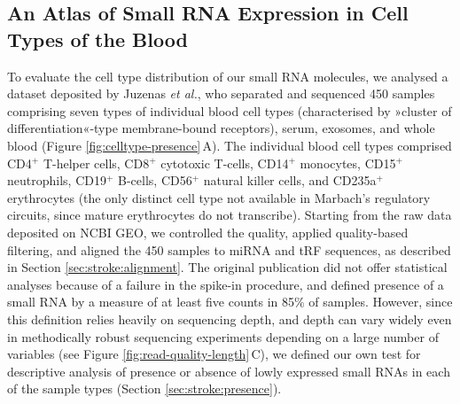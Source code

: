 \begin{method}
\subsection{An Atlas of Small RNA Expression in Cell Types of the Blood} \label{sec:stroke:juzenas}
To evaluate the cell type distribution of our small RNA molecules, we analysed a dataset deposited by Juzenas \emph{et al.},\cite{Juzenas2017} who separated and sequenced 450 samples comprising seven types of individual blood cell types (characterised by »cluster of differentiation«-type membrane-bound receptors), serum, exosomes, and whole blood (Figure \ref{fig:celltype-presence}\,A). The individual blood cell types comprised CD4$^+$ T-helper cells, CD8$^+$ cytotoxic T-cells, CD14$^+$ monocytes, CD15$^+$ neutrophils, CD19$^+$ B-cells, CD56$^+$ natural killer cells, and CD235a$^+$ erythrocytes (the only distinct cell type not available in Marbach's regulatory circuits, since mature erythrocytes do not transcribe). Starting from the raw data deposited on NCBI GEO, we controlled the quality, applied quality-based filtering, and aligned the 450 samples to miRNA and tRF sequences, as described in Section \ref{sec:stroke:alignment}. The original publication did not offer statistical analyses because of a failure in the spike-in procedure, and defined presence of a small RNA by a measure of at least five counts in 85\% of samples. However, since this definition relies heavily on sequencing depth, and depth can vary widely even in methodically robust sequencing experiments depending on a large number of variables (see Figure \ref{fig:read-quality-length}\,C), we defined our own test for descriptive analysis of presence or absence of lowly expressed small RNAs in each of the sample types (Section \ref{sec:stroke:presence}).


\end{method}
